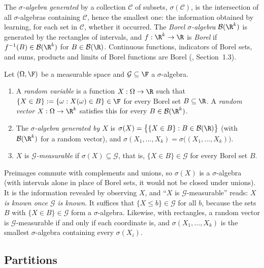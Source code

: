 The \emph{$\sigma$-algebra generated} by a collection $\mathcal C$ of subsets,
$\sigma(\mathcal C)$, is the intersection of all $\sigma$-algebras containing $\mathcal C$,
hence the smallest one: the information obtained by learning, for each set in $\mathcal C$,
whether it occurred. The \emph{Borel $\sigma$-algebra} $\mathcal B(\R^k)$ is generated by
the rectangles of intervals, and $f:\R^k\to\R$ is \emph{Borel} if $f^{-1}(B)\in\mathcal
B(\R^k)$ for $B\in\mathcal B(\R)$. Continuous functions, indicators of Borel sets, and sums,
products and limits of Borel functions are Borel (\textcite{durrett}, Section~1.3).

\begin{definition}\label{def:pr-measurable}
Let $(\Omega,\F)$ be a measurable space and $\mathcal G\subseteq\F$ a $\sigma$-algebra.
\begin{enumerate}[label=(\roman*)]
  \item A \emph{random variable} is a function $X:\Omega\to\R$ such that
    $\{X\in B\}:=\{\omega:X(\omega)\in B\}\in\F$ for every Borel set $B\subseteq\R$. A
    \emph{random vector} $X:\Omega\to\R^k$ satisfies this for every $B\in\mathcal B(\R^k)$.
  \item The \emph{$\sigma$-algebra generated by $X$} is
    $\sigma(X)=\big\{\{X\in B\}:B\in\mathcal B(\R)\big\}$ (with $\mathcal B(\R^k)$ for a
    random vector), and $\sigma(X_1,\dots,X_k)=\sigma\big((X_1,\dots,X_k)\big)$.
  \item $X$ is \emph{$\mathcal G$-measurable} if $\sigma(X)\subseteq\mathcal G$, that is,
    $\{X\in B\}\in\mathcal G$ for every Borel set $B$.
\end{enumerate}
\end{definition}

Preimages commute with complements and unions, so $\sigma(X)$ is a $\sigma$-algebra (with
intervals alone in place of Borel sets, it would not be closed under unions). It is the
information revealed by observing $X$, and ``$X$ is $\mathcal G$-measurable'' reads:
\emph{$X$ is known once $\mathcal G$ is known}. It suffices that $\{X\le b\}\in\mathcal G$
for all $b$, because the sets $B$ with $\{X\in B\}\in\mathcal G$ form a $\sigma$-algebra.
Likewise, with rectangles, a random vector is $\mathcal G$-measurable if and only if each
coordinate is, and $\sigma(X_1,\dots,X_k)$ is the smallest $\sigma$-algebra containing
every $\sigma(X_i)$.

\subsection{Partitions}

